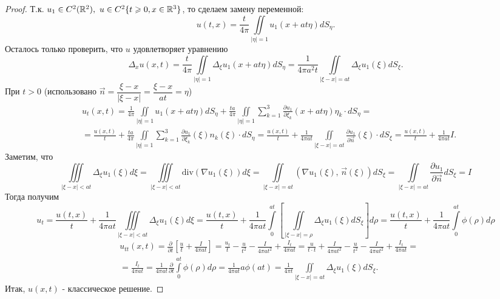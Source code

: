 \begin{proof}
Т.к. $u_1\in C^2(\bR^2),\ u\in C^2\{t\geq 0, x\in\bR^3\}$, то сделаем замену переменной:
\[
u(t, x)=\frac{t}{4\pi}\iint\limits_{|\eta |=1}u_1(x+at\eta )dS_{\eta}.
\]
Осталось только проверить, что $u$ удовлетворяет уравнению
\[
\Delta_xu(x, t)=\frac{t}{4\pi}\iint\limits_{|\eta |=1}\Delta_{\xi}u_1(x+at\eta )dS_{\eta}=\frac{1}{4\pi a^2t}\iint\limits_{|\xi - x|=at}\Delta_{\xi}u_1(\xi )dS_{\xi}.
\]
При $t>0$ (использовано $\vec{n}=\dfrac{\xi - x}{|\xi - x|}=\dfrac{\xi - x}{at}=\eta$)
\begin{equation*}
\begin{split}
&u_t(x,t)=\frac{1}{4\pi}\iint\limits_{|\eta |=1}u_1(x+at\eta )dS_{\eta}+\frac{ta}{4\pi}\iint\limits_{|\eta |=1}\sum\limits_{k=1}^3 \frac{\partial u_1}{\partial \xi_k}(x+at\eta )\eta_k\cdot dS_{\eta}=\\
&=\frac{u(x, t)}{t}+\frac{ta}{4\pi}\iint\limits_{|\eta |=1}\sum\limits_{k=1}^3 \frac{\partial u_1}{\partial \xi_k}(\xi )n_k(\xi )\cdot dS_{\eta}=\frac{u(x, t)}{t}+\frac{1}{4\pi at}\iint\limits_{|\xi - x |=at}\frac{\partial u_1}{\partial \vec{n}}(\xi )\cdot dS_{\xi}=\frac{u(x, t)}{t} + \frac{1}{4\pi at}I.
\end{split}
\end{equation*}
Заметим, что
\[
\iiint\limits_{|\xi - x|<at}\Delta_{\xi}u_1(\xi )d\xi =\iiint\limits_{|\xi - x|<at}\mathrm{div} (\nabla u_1(\xi ))d\xi =\iint\limits_{|\xi - x|=at}\left(\nabla u_1(\xi ),\, \vec{n}(\xi )\right)dS_{\xi }=\iint\limits_{|\xi - x|=at}\frac{\partial u_1}{\partial\vec{n}}dS_{\xi }=I
\]
Тогда получим 
\[
u_t=\frac{u(t, x)}{t}+\frac{1}{4\pi at}\iiint\limits_{|\xi - x|<at}\Delta_{\xi}u_1(\xi )d\xi = \frac{u(t, x)}{t}+\frac{1}{4\pi at}\int\limits_0^{at}\left[\iint\limits_{|\xi - x|=\rho}\Delta_{\xi}u_1(\xi )dS_{\xi}\right]d\rho=\frac{u(t, x)}{t}+\frac{1}{4\pi at}\int\limits_0^{at}\phi (\rho )d\rho
\]
\begin{equation*}
\begin{split}
&u_{tt}(x, t)=\frac{\partial}{\partial t}\left[\frac{u}{t}+\frac{I}{4\pi at} \right]=\frac{u_t}{t}-\frac{u}{t^2}-\frac{I}{4\pi at^2}+\frac{I_t}{4\pi at}=\frac{u}{t\cdot t}+\frac{I}{4\pi at^2}-\frac{u}{t^2}-\frac{I}{4\pi at^2}+\frac{I_t}{4\pi at}=\\
&=\frac{I_t}{4\pi at}=\frac{1}{4\pi at}\frac{\partial}{\partial t}\int\limits_0^{at}\phi (\rho )d\rho = \frac{1}{4\pi at}a\phi(at)=\frac{1}{4\pi t}\iint\limits_{|\xi - x|=at}\Delta_{\xi}u_1(\xi )dS_{\xi}.
\end{split}
\end{equation*}
Итак, $u(x, t)$ - классическое решение.
\end{proof}


